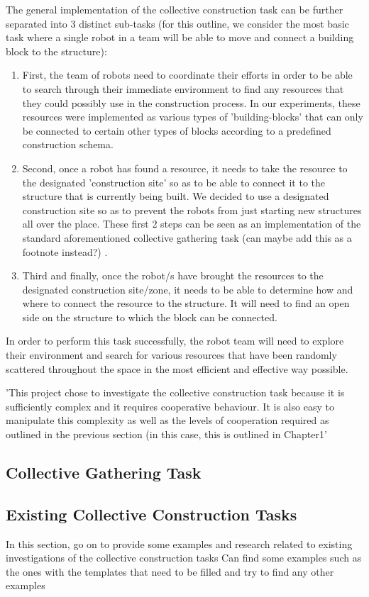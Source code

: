 The general implementation of the collective construction task can be further separated into 3 distinct sub-tasks (for this outline, we consider the most basic task where a single robot in a team will be able to move and connect a building block to the structure):
\begin{enumerate}
	\item First, the team of robots need to coordinate their efforts in order to be able to search through their immediate environment to find any resources that they could possibly use in the construction process. In our experiments, these resources were implemented as various types of 'building-blocks' that can only be connected to certain other types of blocks according to a predefined construction schema.
	\item Second, once a robot has found a resource, it needs to take the resource to the designated 'construction site' so as to be able to connect it to the structure that is currently being built. We decided to use a designated construction site so as to prevent the robots from just starting new structures all over the place. These first 2 steps can be seen as an implementation of the standard aforementioned collective gathering task (can maybe add this as a footnote instead?) \cite{NitschkeSaEC2012}.
	\item Third and finally, once the robot/s have brought the resources to the designated construction site/zone, it needs to be able to determine how and where to connect the resource to the structure. It will need to find an open side on the structure to which the block can be connected.
\end{enumerate}

In order to perform this task successfully, the robot team will need to explore their environment and search for various resources that have been randomly scattered throughout the space in the most efficient and effective way possible.

'This project chose to investigate the collective construction task because it is sufficiently complex and it requires cooperative behaviour. It is also easy to manipulate this complexity as well as the levels of cooperation required as outlined in the previous section (in this case, this is outlined in Chapter1'



\subsection{Collective Gathering Task}

\subsection{Existing Collective Construction Tasks}
In this section, go on to provide some examples and research related to existing investigations of the collective construction tasks
Can find some examples such as the ones with the templates that need to be filled and try to find any other examples
